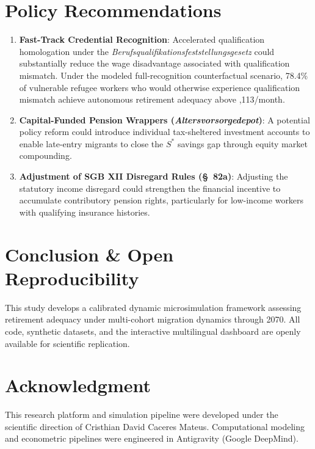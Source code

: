 \documentclass[conference]{IEEEtran}
\begin{document}
\section{Policy Recommendations}
\begin{enumerate}
    \item \textbf{Fast-Track Credential Recognition}: Accelerated qualification homologation under the \textit{Berufsqualifikationsfeststellungsgesetz} could substantially reduce the wage disadvantage associated with qualification mismatch. Under the modeled full-recognition counterfactual scenario, 78.4\% of vulnerable refugee workers who would otherwise experience qualification mismatch achieve autonomous retirement adequacy above ,113/month.
    \item \textbf{Capital-Funded Pension Wrappers (\textit{Altersvorsorgedepot})}: A potential policy reform could introduce individual tax-sheltered investment accounts to enable late-entry migrants to close the $S^*$ savings gap through equity market compounding.
    \item \textbf{Adjustment of SGB XII Disregard Rules (\S~82a)}: Adjusting the statutory income disregard could strengthen the financial incentive to accumulate contributory pension rights, particularly for low-income workers with qualifying insurance histories.
\end{enumerate}

\section{Conclusion \& Open Reproducibility}
This study develops a calibrated dynamic microsimulation framework assessing retirement adequacy under multi-cohort migration dynamics through 2070. All code, synthetic datasets, and the interactive multilingual dashboard are openly available for scientific replication.

\section*{Acknowledgment}
This research platform and simulation pipeline were developed under the scientific direction of Cristhian David Caceres Mateus. Computational modeling and econometric pipelines were engineered in Antigravity (Google DeepMind).



\end{document}

